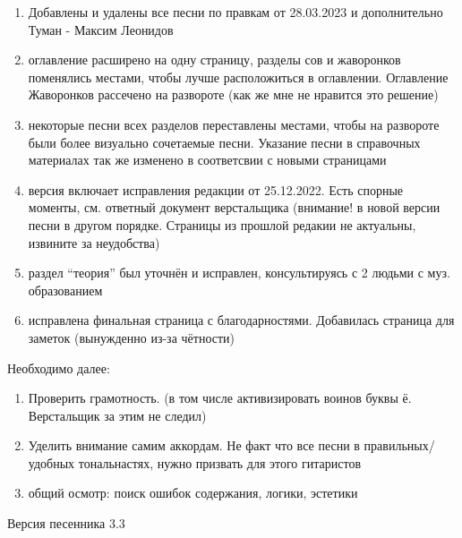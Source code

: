 \documentclass[fleqn,a5paper,12pt,twoside]{guitartabs}
\begin{document}
\begin{enumerate}
\item Добавлены и удалены все песни по правкам от 28.03.2023 и
дополнительно Туман - Максим Леонидов
\item оглавление расширено на одну страницу, разделы сов и жаворонков поменялись местами, чтобы лучше расположиться в оглавлении. Оглавление Жаворонков рассечено на развороте (как же мне не нравится это решение)
\item некоторые песни всех разделов переставлены местами, чтобы на развороте были более визуально сочетаемые песни.
Указание песни в справочных материалах так же изменено
в соответсвии с новыми страницами
\item версия включает исправления редакции от 25.12.2022. Есть
спорные моменты, см. ответный документ верстальщика
(внимание! в новой версии песни в другом порядке. Страницы из прошлой редакии не актуальны, извините за неудобства)
\item раздел “теория” был уточнён и исправлен, консультируясь
с 2 людьми с муз. образованием
\item исправлена финальная страница с благодарностями. Добавилась страница для заметок (вынужденно из-за чётности)
\end{enumerate}
Необходимо далее:
\begin{enumerate}
\item Проверить грамотность. (в том числе активизировать воинов буквы ё. Верстальщик за этим не следил)
\item Уделить внимание самим аккордам. Не факт что все песни
в правильных/удобных тональнастях, нужно призвать для
этого гитаристов
\item общий осмотр: поиск ошибок содержания, логики, эстетики
\end{enumerate}
\newpage
Версия песенника 3.3
\end{document}

